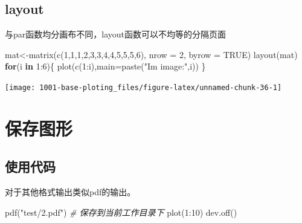 \documentclass[
]{book}
\newenvironment{Shaded}{\begin{snugshade}}{\end{snugshade}}
\newcommand{\AttributeTok}[1]{\textcolor[rgb]{0.77,0.63,0.00}{#1}}
\newcommand{\CommentTok}[1]{\textcolor[rgb]{0.56,0.35,0.01}{\textit{#1}}}
\newcommand{\ConstantTok}[1]{\textcolor[rgb]{0.00,0.00,0.00}{#1}}
\newcommand{\ControlFlowTok}[1]{\textcolor[rgb]{0.13,0.29,0.53}{\textbf{#1}}}
\newcommand{\DecValTok}[1]{\textcolor[rgb]{0.00,0.00,0.81}{#1}}
\newcommand{\FunctionTok}[1]{\textcolor[rgb]{0.00,0.00,0.00}{#1}}
\newcommand{\NormalTok}[1]{#1}
\newcommand{\OtherTok}[1]{\textcolor[rgb]{0.56,0.35,0.01}{#1}}
\newcommand{\SpecialCharTok}[1]{\textcolor[rgb]{0.00,0.00,0.00}{#1}}
\newcommand{\StringTok}[1]{\textcolor[rgb]{0.31,0.60,0.02}{#1}}
\begin{document}
\hypertarget{layout}{%
\subsection{layout}\label{layout}}

与par函数均分画布不同，layout函数可以不均等的分隔页面

\begin{Shaded}
\begin{Highlighting}[]
\NormalTok{mat}\OtherTok{\textless{}{-}}\FunctionTok{matrix}\NormalTok{(}\FunctionTok{c}\NormalTok{(}\DecValTok{1}\NormalTok{,}\DecValTok{1}\NormalTok{,}\DecValTok{1}\NormalTok{,}\DecValTok{2}\NormalTok{,}\DecValTok{3}\NormalTok{,}\DecValTok{3}\NormalTok{,}\DecValTok{4}\NormalTok{,}\DecValTok{4}\NormalTok{,}\DecValTok{5}\NormalTok{,}\DecValTok{5}\NormalTok{,}\DecValTok{5}\NormalTok{,}\DecValTok{6}\NormalTok{), }\AttributeTok{nrow =} \DecValTok{2}\NormalTok{, }\AttributeTok{byrow =} \ConstantTok{TRUE}\NormalTok{)}
\FunctionTok{layout}\NormalTok{(mat)}
\ControlFlowTok{for}\NormalTok{(i }\ControlFlowTok{in} \DecValTok{1}\SpecialCharTok{:}\DecValTok{6}\NormalTok{)\{}
  \FunctionTok{plot}\NormalTok{(}\FunctionTok{c}\NormalTok{(}\DecValTok{1}\SpecialCharTok{:}\NormalTok{i),}\AttributeTok{main=}\FunctionTok{paste}\NormalTok{(}\StringTok{"I\textquotesingle{}m image:"}\NormalTok{,i))}
\NormalTok{\}}
\end{Highlighting}
\end{Shaded}

\begin{center}\texttt{[image: 1001-base-ploting\_files/figure-latex/unnamed-chunk-36-1]} \end{center}

\hypertarget{ux4fddux5b58ux56feux5f62}{%
\section{保存图形}\label{ux4fddux5b58ux56feux5f62}}

\hypertarget{ux4f7fux7528ux4ee3ux7801}{%
\subsection{使用代码}\label{ux4f7fux7528ux4ee3ux7801}}

对于其他格式输出类似pdf的输出。

\begin{Shaded}
\begin{Highlighting}[]
\FunctionTok{pdf}\NormalTok{(}\StringTok{"test/2.pdf"}\NormalTok{)  }\CommentTok{\# 保存到当前工作目录下}
\FunctionTok{plot}\NormalTok{(}\DecValTok{1}\SpecialCharTok{:}\DecValTok{10}\NormalTok{)}
\FunctionTok{dev.off}\NormalTok{()}
\end{Highlighting}
\end{Shaded}
\end{document}
